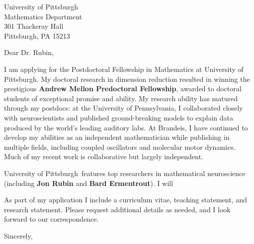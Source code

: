 \documentclass[11pt,a4paper]{letter}
\begin{document}

\def\School{University of Pittsburgh}

\begin{letter}
{University of Pittsburgh\\
Mathematics Department\\
301 Thackeray Hall\\
Pittsburgh, PA 15213}


\opening{Dear Dr. Rubin,}

I am applying for the Postdoctoral Fellowship in Mathematics at \School. My doctoral research in dimension reduction resulted in winning the prestigious \textbf{Andrew Mellon Predoctoral Fellowship}, awarded to doctoral students of exceptional promise and ability. My research ability has matured through my postdocs: at the University of Pennsylvania, I collaborated closely with neuroscientists and published ground-breaking models to explain data produced by the world's leading auditory labs. At Brandeis, I have continued to develop my abilities as an independent mathematician while publishing in multiple fields, including coupled oscillators and molecular motor dynamics. Much of my recent work is collaborative but largely independent.



\School~features top researchers in mathematical neuroscience (including \textbf{Jon Rubin} and \textbf{Bard Ermentrout}). I will 



As part of my application I include a curriculum vitae, teaching statement, and research statement. Please request additional details as needed, and I look forward to our correspondence.

\closing{Sincerely,}
\end{letter}
\end{document}
